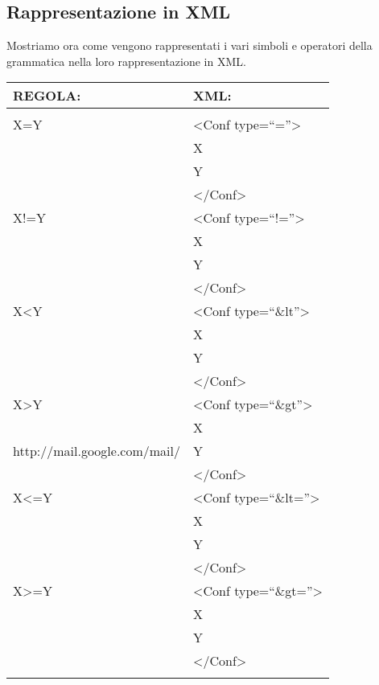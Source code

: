 \subsection{Rappresentazione in XML}
Mostriamo ora come vengono rappresentati i vari simboli e operatori della grammatica nella loro rappresentazione in XML.
\begin{table}[htbp]
\begin{tabular}{||p{3cm}||p{6.5cm}||}
\hline
\textbf{REGOLA:} & \textbf{XML:} \\ \hline
& \\ \hline
X=Y & \textless Conf type=``=''\textgreater \\
&   X \\
&   Y \\ 
& \textless /Conf\textgreater \\ \hline
X!=Y & \textless Conf type=``!=''\textgreater \\
&  X \\
&  Y \\ 
& \textless /Conf\textgreater\\ \hline
X\textless Y & \textless Conf type=``\&lt''\textgreater \\
&  X \\
&  Y \\ 
& \textless /Conf\textgreater\\ \hline
X\textgreater Y & \textless Conf type=``\&gt''\textgreater \\
&  X \\http://mail.google.com/mail/
&  Y \\ 
& \textless /Conf\textgreater\\ \hline
X\textless=Y & \textless Conf type=``\&lt=''\textgreater \\
&  X \\
&  Y \\ 
& \textless /Conf\textgreater\\ \hline
X\textgreater =Y &  \textless Conf type=``\&gt=''\textgreater \\
&  X \\
&  Y \\ 
& \textless /Conf\textgreater\\ \hline
& \\ \hline
\end{tabular} \\
\end{table}

